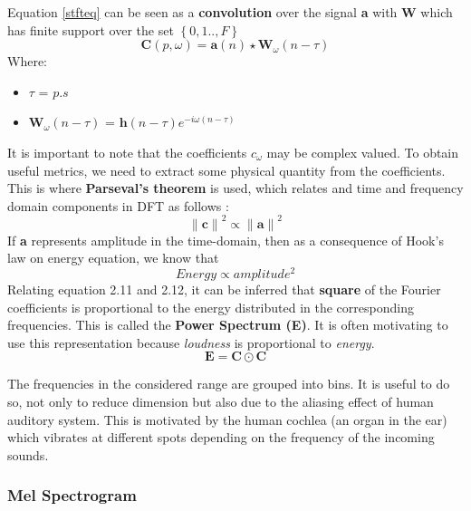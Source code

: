 \noindent Equation \ref{stfteq} can be seen as a \textbf{convolution} over the signal \textbf{a} with \textbf{W} which has finite support over the set $\left\{0,1..,F \right\}$
\begin{equation}
\label{eq:stft}
\boxed
{
  \textbf{C}(p, \omega ) = \textbf{a}(n) \star \textbf{W}_{\omega}(n- \tau)
}
\end{equation}
Where:
\begin{itemize}[label=]
    \setlength\itemsep{0em}
    \item $ \tau$ = $p.s$
    \item $\textbf{W}_{\omega}(n- \tau)$ = $\textbf{h}(n- \tau )e^{-i \omega (n- \tau)}$
\end{itemize}
It is important to note that the coefficients $c_{\omega}$ may be complex valued. To obtain useful metrics, we need to extract some physical quantity from the coefficients. This is where \textbf{Parseval's theorem} is used, which relates and time and frequency domain components in DFT as follows \cite{allen} :
\begin{equation}
{\|\textbf{c}\|}^2 \propto {\|\textbf{a}\|}^2
\end{equation}
If \textbf{a} represents amplitude in the time-domain, then as a consequence of Hook's law  on energy equation, we know that
\begin{equation}
Energy \propto amplitude^2
\end{equation}
Relating equation 2.11 and 2.12, it can be inferred that \textbf{square} of the Fourier coefficients is proportional to the energy distributed in the corresponding frequencies. This is called the \textbf{Power Spectrum (E)}. It is often motivating to use this representation because \textit{loudness} is proportional to \textit{energy}.
\begin{equation}
\label{energy}
\textbf{E} = \textbf{C} \odot \textbf{C}
\end{equation}

\noindent The frequencies in the considered range are  grouped into bins. It is useful to do so, not only to reduce dimension but also due to the aliasing effect of human auditory system. This is motivated by the human cochlea (an organ in the ear) which vibrates at different spots depending on the frequency of the incoming sounds.
  
\subsubsection{Mel Spectrogram}
\label{mel}

